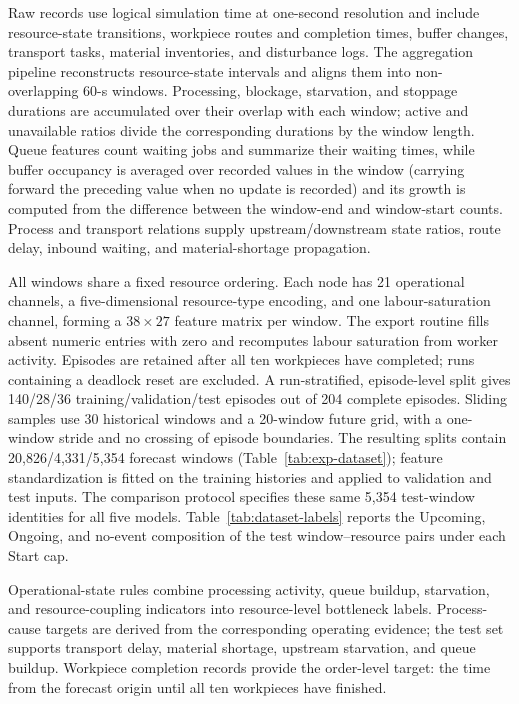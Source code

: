 \documentclass[a4paper,fleqn]{cas-dc}
\begin{document}
Raw records use logical simulation time at one-second resolution and include resource-state transitions, workpiece routes and completion times, buffer changes, transport tasks, material inventories, and disturbance logs. The aggregation pipeline reconstructs resource-state intervals and aligns them into non-overlapping 60-s windows. Processing, blockage, starvation, and stoppage durations are accumulated over their overlap with each window; active and unavailable ratios divide the corresponding durations by the window length. Queue features count waiting jobs and summarize their waiting times, while buffer occupancy is averaged over recorded values in the window (carrying forward the preceding value when no update is recorded) and its growth is computed from the difference between the window-end and window-start counts. Process and transport relations supply upstream/downstream state ratios, route delay, inbound waiting, and material-shortage propagation.

All windows share a fixed resource ordering. Each node has 21 operational channels, a five-dimensional resource-type encoding, and one labour-saturation channel, forming a $38\times27$ feature matrix per window. The export routine fills absent numeric entries with zero and recomputes labour saturation from worker activity. Episodes are retained after all ten workpieces have completed; runs containing a deadlock reset are excluded. A run-stratified, episode-level split gives 140/28/36 training/validation/test episodes out of 204 complete episodes. Sliding samples use 30 historical windows and a 20-window future grid, with a one-window stride and no crossing of episode boundaries. The resulting splits contain 20,826/4,331/5,354 forecast windows (Table~\ref{tab:exp-dataset}); feature standardization is fitted on the training histories and applied to validation and test inputs. The comparison protocol specifies these same 5,354 test-window identities for all five models. Table~\ref{tab:dataset-labels} reports the Upcoming, Ongoing, and no-event composition of the test window--resource pairs under each Start cap.

Operational-state rules combine processing activity, queue buildup, starvation, and resource-coupling indicators into resource-level bottleneck labels. Process-cause targets are derived from the corresponding operating evidence; the test set supports transport delay, material shortage, upstream starvation, and queue buildup. Workpiece completion records provide the order-level target: the time from the forecast origin until all ten workpieces have finished.
\end{document}
